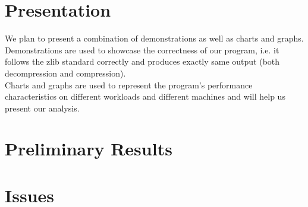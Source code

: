 \documentclass{article}
\begin{document}
\section{Presentation}
We plan to present a combination of demonstrations as well as charts and graphs.\\
Demonstrations are used to showcase the correctness of our program, i.e. it follows the zlib standard correctly and produces exactly same output (both decompression and compression).\\
Charts and graphs are used to represent the program's performance characteristics on different workloads and different machines and will help us present our analysis.
\section{Preliminary Results}

\section{Issues}
\end{document}

